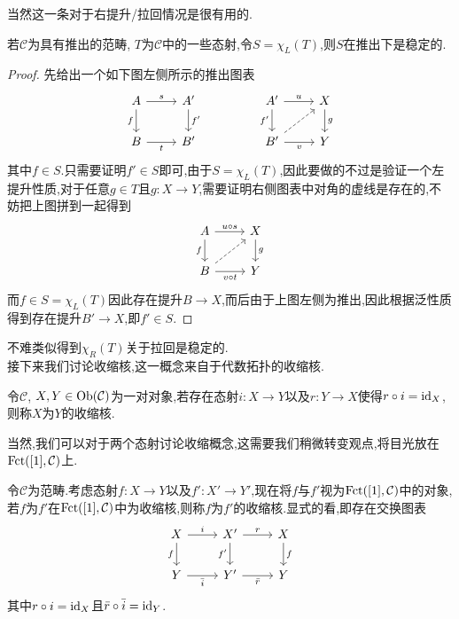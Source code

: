 当然这一条对于右提升/拉回情况是很有用的.
\begin{proposition}\label{命题:推出下稳定}
    若$\mathcal{C}$为具有推出的范畴, $T$为$\mathcal{C}$中的一些态射,令$S = \chi_L(T)$,则$S$在推出下是稳定的.
\end{proposition}
\begin{proof}
    先给出一个如下图左侧所示的推出图表
    \[\begin{tikzcd}
	A & {A'} && {A'} & X \\
	B & {B'} && {B'} & Y
	\arrow["s", from=1-1, to=1-2]
	\arrow["f"', from=1-1, to=2-1]
	\arrow["{f'}", from=1-2, to=2-2]
	\arrow["u", from=1-4, to=1-5]
	\arrow["{f'}"', from=1-4, to=2-4]
	\arrow["g", from=1-5, to=2-5]
	\arrow["t"', from=2-1, to=2-2]
	\arrow[dashed, from=2-4, to=1-5]
	\arrow["v"', from=2-4, to=2-5]
    \end{tikzcd}\]
    其中$f\in S$.只需要证明$f'\in S$即可,由于$S = \chi_L(T)$,因此要做的不过是验证一个左提升性质,对于任意$g\in T$且$g:X \to Y$,需要证明右侧图表中对角的虚线是存在的,不妨把上图拼到一起得到
    \[\begin{tikzcd}
	A & X \\
	B & Y
	\arrow["{u\circ s}", from=1-1, to=1-2]
	\arrow["f"', from=1-1, to=2-1]
	\arrow["g", from=1-2, to=2-2]
	\arrow[dashed, from=2-1, to=1-2]
	\arrow["{v\circ t}"', from=2-1, to=2-2]
    \end{tikzcd}\]
    而$f\in S = \chi_L(T)$因此存在提升$B \to X$,而后由于上图左侧为推出,因此根据泛性质得到存在提升$B' \to X$,即$f'\in S$.
\end{proof}
不难类似得到$\chi_R(T)$关于拉回是稳定的.\\
接下来我们讨论收缩核,这一概念来自于代数拓扑的收缩核.
\begin{definition}[收缩核]
    令$\mathcal{C}$, $X,Y\in \operatorname{Ob} (\mathcal{C})$为一对对象,若存在态射$i : X\to Y$以及$r: Y\to X$使得$r\circ i = \mathrm{id}_{X}$,则称$X$为$Y$的收缩核.
\end{definition}
当然,我们可以对于两个态射讨论收缩概念,这需要我们稍微转变观点,将目光放在$\operatorname{Fct}([1],\mathcal{C})$上.
\begin{definition}[态射作为收缩核]
    令$\mathcal{C}$为范畴.考虑态射$f: X \to Y$以及$f' : X' \to Y'$,现在将$f$与$f'$视为$\operatorname{Fct}([1],\mathcal{C})$中的对象,若$f$为$f'$在$\operatorname{Fct}([1],\mathcal{C})$中为收缩核,则称$f$为$f'$的收缩核.显式的看,即存在交换图表
    \[\begin{tikzcd}
	X & {X'} & X \\
	Y & {Y'} & Y
	\arrow["i", from=1-1, to=1-2]
	\arrow["f"', from=1-1, to=2-1]
	\arrow["r", from=1-2, to=1-3]
	\arrow["{f'}"', from=1-2, to=2-2]
	\arrow["f", from=1-3, to=2-3]
	\arrow["{\bar{i}}"', from=2-1, to=2-2]
	\arrow["{\bar{r}}"', from=2-2, to=2-3]
    \end{tikzcd}\]
    其中$r\circ i = \mathrm{id}_{X}$且$\bar{r}\circ \bar{i} = \mathrm{id}_{Y}$.
\end{definition}
